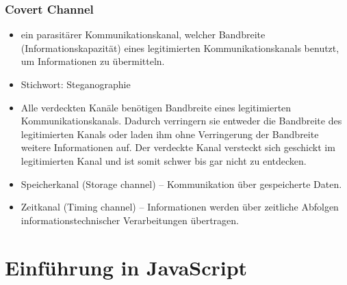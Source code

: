 \documentclass{article} %
\begin{document}
	\subsubsection{Covert Channel}
	\begin{itemize}
		\item ein parasitärer Kommunikationskanal, welcher Bandbreite (Informationskapazität) eines legitimierten Kommunikationskanals benutzt, um Informationen zu übermitteln.
		\item Stichwort: Steganographie
		\item Alle verdeckten Kanäle benötigen Bandbreite eines legitimierten Kommunikationskanals. Dadurch verringern sie entweder die Bandbreite des legitimierten Kanals oder laden ihm ohne Verringerung der Bandbreite weitere Informationen auf. Der verdeckte Kanal versteckt sich geschickt im legitimierten Kanal und ist somit schwer bis gar nicht zu entdecken.
		\item Speicherkanal (Storage channel) – Kommunikation über gespeicherte Daten.
		\item Zeitkanal (Timing channel) – Informationen werden über zeitliche Abfolgen informationstechnischer Verarbeitungen übertragen.
	\end{itemize}
	\section{Einführung in JavaScript}
\end{document}
